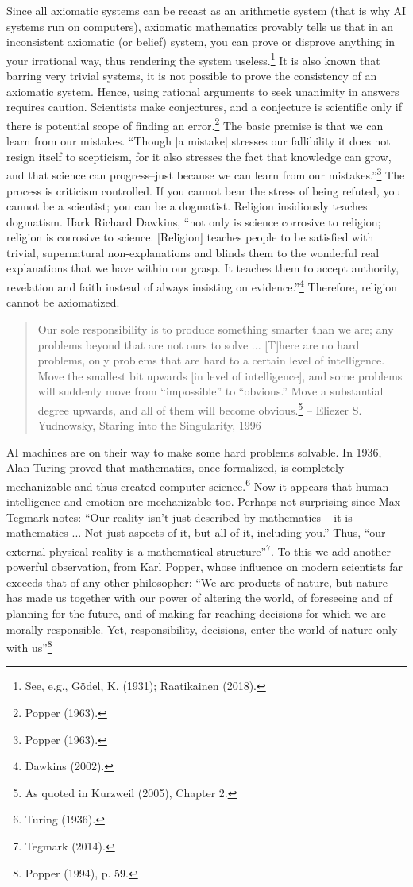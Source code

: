 \begin{multicols}{2}
Since all axiomatic systems can be recast as an arithmetic system (that is why AI systems run on computers), axiomatic mathematics provably tells us that in an inconsistent axiomatic (or belief) system, you can prove or disprove anything in your irrational way, thus rendering the system useless.\footnote{See, e.g., Gödel, K. (1931); Raatikainen (2018).}  It is also known that barring very trivial systems, it is not possible to prove the consistency of an axiomatic system. Hence, using rational arguments to seek unanimity in answers requires caution. Scientists make conjectures, and a conjecture is scientific only if there is potential scope of finding an error.\footnote{Popper (1963).}  The basic premise is that we can learn from our mistakes. “Though [a mistake] stresses our fallibility it does not resign itself to scepticism, for it also stresses the fact that knowledge can grow, and that science can progress--just because we can learn from our mistakes.”\footnote{Popper (1963).}  The process is criticism controlled. If you cannot bear the stress of being refuted, you cannot be a scientist; you can be a dogmatist. Religion insidiously teaches dogmatism. Hark Richard Dawkins, “not only is science corrosive to religion; religion is corrosive to science. [Religion] teaches people to be satisfied with trivial, supernatural non-explanations and blinds them to the wonderful real explanations that we have within our grasp. It teaches them to accept authority, revelation and faith instead of always insisting on evidence.”\footnote{Dawkins (2002).}  Therefore, religion cannot be axiomatized.
\begin{quote}
Our sole responsibility is to produce something smarter than we are; any problems beyond that are not ours to solve ... [T]here are no hard problems, only problems that are hard to a certain level of intelligence. Move the smallest bit upwards [in level of intelligence], and some problems will suddenly move from “impossible” to “obvious.” Move a substantial degree upwards, and all of them will become obvious.\footnote{As quoted in Kurzweil (2005), Chapter 2.}  -- Eliezer S. Yudnowsky, Staring into the Singularity, 1996 
\end{quote}

AI machines are on their way to make some hard problems solvable. In 1936, Alan Turing proved that mathematics, once formalized, is completely mechanizable and thus created computer science.\footnote{Turing (1936).}  Now it appears that human intelligence and emotion are mechanizable too. Perhaps not surprising since Max Tegmark notes: “Our reality isn't just described by mathematics – it is mathematics ... Not just aspects of it, but all of it, including you.” Thus, “our external physical reality is a mathematical structure”\footnote{Tegmark (2014).}. To this we add another powerful observation, from Karl Popper, whose influence on modern scientists far exceeds that of any other philosopher: “We are products of nature, but nature has made us together with our power of altering the world, of foreseeing and of planning for the future, and of making far-reaching decisions for which we are morally responsible. Yet, responsibility, decisions, enter the world of nature only with us”\footnote{Popper (1994), p. 59.}


\end{multicols}

